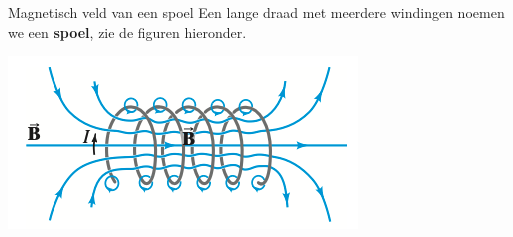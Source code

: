 \begin{theo}{Magnetisch veld van een spoel}
    Een lange draad met meerdere windingen noemen we een \textbf{spoel}, zie de figuren hieronder.


        \begin{center}
            \includegraphics[scale = 0.4]{Images/Magnetisme/Spoel}
        \end{center}



\end{theo}
